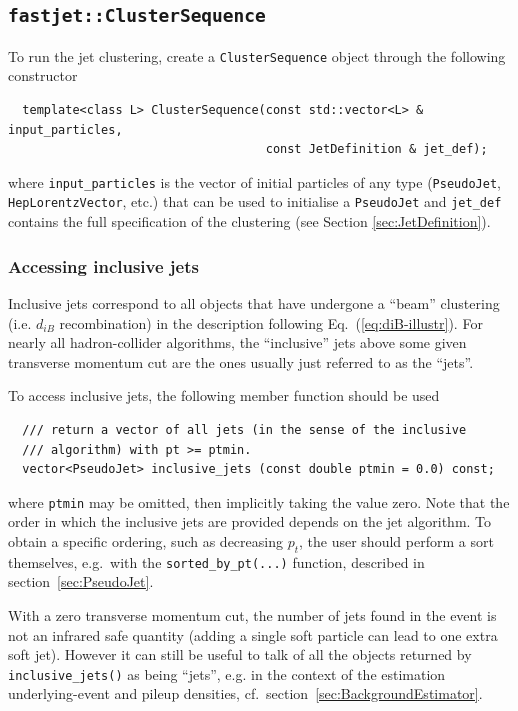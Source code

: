 \documentclass[12pt,a4]{article}
\newcommand{\ttt}[1]{{\small\texttt{#1}}}
\begin{document}
\subsection{\tt fastjet::ClusterSequence}
\label{sec:ClusterSequence}

To run the jet clustering, create a \ttt{ClusterSequence}
object
through the following constructor
\begin{lstlisting}
  template<class L> ClusterSequence(const std::vector<L> & input_particles,
                                    const JetDefinition & jet_def); 
\end{lstlisting}
where \ttt{input\_particles} is the vector of initial particles of any
type (\ttt{PseudoJet}, \ttt{HepLorentzVector}, etc.) that can be
used to initialise a \ttt{PseudoJet} and \ttt{jet\_def} contains
the full specification of the clustering (see Section
\ref{sec:JetDefinition}).

\subsubsection{Accessing inclusive jets}

Inclusive jets correspond to all objects that have undergone a
``beam'' clustering (i.e. $d_{iB}$ recombination) in the description
following Eq.~(\ref{eq:diB-illustr}).
%
For nearly all hadron-collider algorithms, the ``inclusive'' jets
above some given transverse momentum cut are the ones usually just
referred to as the ``jets''.

To access inclusive jets, the following member function should be used
\begin{lstlisting}
  /// return a vector of all jets (in the sense of the inclusive
  /// algorithm) with pt >= ptmin. 
  vector<PseudoJet> inclusive_jets (const double ptmin = 0.0) const;
\end{lstlisting}
where \ttt{ptmin} may be omitted, then implicitly taking the value
zero.
%
Note that the order in which the inclusive jets are provided depends
on the jet algorithm. To obtain a specific ordering, such as
decreasing $p_t$, the user should perform a sort themselves, e.g.\
with the \ttt{sorted\_by\_pt(...)} function, described in
section~\ref{sec:PseudoJet}. 

With a zero transverse momentum cut, the number of jets found in the
event is not an infrared safe quantity (adding a single soft particle
can lead to one extra soft jet).
%
However it can still be useful to talk of all the objects returned by
\ttt{inclusive\_jets()} as being ``jets'', e.g. in the context of the
estimation underlying-event and pileup densities, cf.\
section~\ref{sec:BackgroundEstimator}. 
\end{document}
